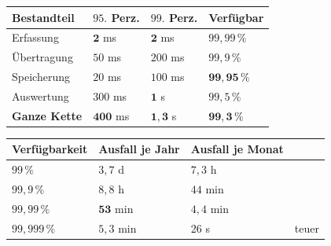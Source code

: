 \begin{aufgabe}
\begin{center}
{\small
\renewcommand{\arraystretch}{1.45}
\begin{tabular}{@{}P{2.4cm}P{2.0cm}P{2.0cm}P{2.2cm}@{}}
\toprule
\textbf{Bestandteil} & \textbf{$95.$ Perz.} & \textbf{$99.$ Perz.} & \textbf{Verfügbar}\\
\midrule
Erfassung & $\mathbf{2}$ ms & $\mathbf{2}$ ms & $99{,}99\,\%$\\
Übertragung & $50$ ms & $200$ ms & $99{,}9\,\%$\\
Speicherung & $20$ ms & $100$ ms & $\mathbf{99{,}95\,\%}$\\
Auswertung & $300$ ms & $\mathbf{1}$ s & $99{,}5\,\%$\\
\textbf{Ganze Kette} & $\mathbf{400}$ ms & $\mathbf{1{,}3}$ s & $\mathbf{99{,}3\,\%}$\\
\bottomrule
\end{tabular}}
\end{center}

\begin{center}
\begin{minipage}{0.88\textwidth}
\end{minipage}
\end{center}

\begin{center}
\end{center}

\begin{center}
\renewcommand{\arraystretch}{1.45}
\begin{tabular}{@{}P{3.0cm}P{2.0cm}P{2.6cm}P{1.2cm}@{}}
\toprule
\textbf{Verfügbarkeit} & \textbf{Ausfall je Jahr} & \textbf{Ausfall je Monat} & \\
\midrule
$99\,\%$ & $3{,}7$ d & $7{,}3$ h & \\
$99{,}9\,\%$ & $8{,}8$ h & $44$ min & \\
$99{,}99\,\%$ & $\mathbf{53}$ min & $4{,}4$ min & \\
$99{,}999\,\%$ & $5{,}3$ min & $26$ s & \textcolor{akzent}{teuer}\\
\bottomrule
\end{tabular}
\end{center}


\end{aufgabe}
